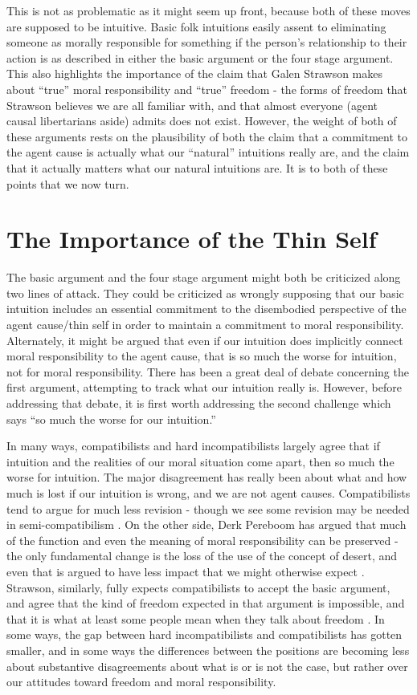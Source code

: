 \documentclass[phd,12pt,oneside,paper=letterpaper]{ubcthesis}
\begin{document}
This is not as problematic as it might seem up front, because both of these moves are supposed to be intuitive. Basic folk intuitions easily assent to eliminating someone as morally responsible for something if the person's relationship to their action is as described in either the basic argument or the four stage argument. This also highlights the importance of the claim that Galen Strawson makes about ``true'' moral responsibility and ``true'' freedom - the forms of freedom that Strawson believes we are all familiar with, and that almost everyone (agent causal libertarians aside) admits does not exist. However, the weight of both of these arguments rests on the plausibility of both the claim that a commitment to the agent cause is actually what our ``natural'' intuitions really are, and the claim that it actually matters what our natural intuitions are. It is to both of these points that we now turn.

\section{The Importance of the Thin Self}
The basic argument and the four stage argument might both be criticized along two lines of attack. They could be criticized as wrongly supposing that our basic intuition includes an essential commitment to the disembodied perspective of the agent cause/thin self in order to maintain a commitment to moral responsibility. Alternately, it might be argued that even if our intuition does implicitly connect moral responsibility to the agent cause, that is so much the worse for intuition, not for moral responsibility. There has been a great deal of debate concerning the first argument, attempting to track what our intuition really is. However, before addressing that debate, it is first worth addressing the second challenge which says ``so much the worse for our intuition.''

In many ways, compatibilists and hard incompatibilists largely agree that if intuition and the realities of our moral situation come apart, then so much the worse for intuition. The major disagreement has really been about what and how much is lost if our intuition is wrong, and we are not agent causes. Compatibilists tend to argue for much less revision - though we see some revision may be needed in semi-compatibilism \citep{fischerravizza1998}. On the other side, Derk Pereboom has argued that much of the function and even the meaning of moral responsibility can be preserved - the only fundamental change is the loss of the use of the concept of desert, and even that is argued to have less impact that we might otherwise expect \citep{pereboom2001}. Strawson, similarly, fully expects compatibilists to accept the basic argument, and agree that the kind of freedom expected in that argument is impossible, and that it is what at least some people mean when they talk about freedom \citep{strawsong2010}. In some ways, the gap between hard incompatibilists and compatibilists has gotten smaller, and in some ways the differences between the positions are becoming less about substantive disagreements about what is or is not the case, but rather over our attitudes toward freedom and moral responsibility. 
\end{document}
